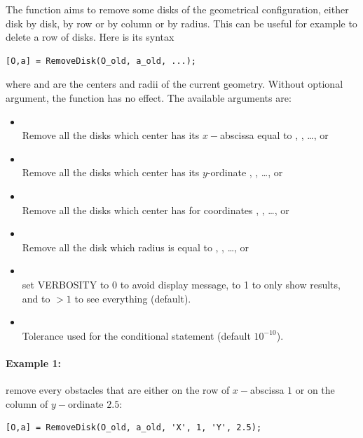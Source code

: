 The function  aims to remove some disks of the geometrical configuration, either disk by disk, by row or by column or by radius. This can be useful for example to delete a row of disks. Here is its syntax
\begin{lstlisting}
[O,a] = RemoveDisk(O_old, a_old, ...);
\end{lstlisting}
where  and  are the centers and radii of the current geometry. Without optional argument, the function has no effect. The available arguments are:
\begin{itemize}
\item {}\\
Remove all the disks which center has its $x-$abscissa equal to , , \ldots, or 
\item {}\\
Remove all the disks which center has its $y$-ordinate , , \ldots, or 
\item {}\\
Remove all the disks which center has for coordinates \code{[X1;Y1]}, \code{[X2;Y2]}, \ldots, or \code{[XN;YN]}
\item {}\\
Remove all the disk which radius is equal to , , \ldots, or 
\item {}\\
set VERBOSITY to 0 to avoid display message, to 1 to only show results, and to $>1$ to see everything (default).
\item {}\\
Tolerance used for the conditional statement (default $10^{-10}$).
\end{itemize}

\paragraph{Example 1:} remove every obstacles that are either on the row of $x-$abscissa $1$ or on the column of $y-$ordinate $2.5$:
\begin{lstlisting}
[O,a] = RemoveDisk(O_old, a_old, 'X', 1, 'Y', 2.5);
\end{lstlisting}

